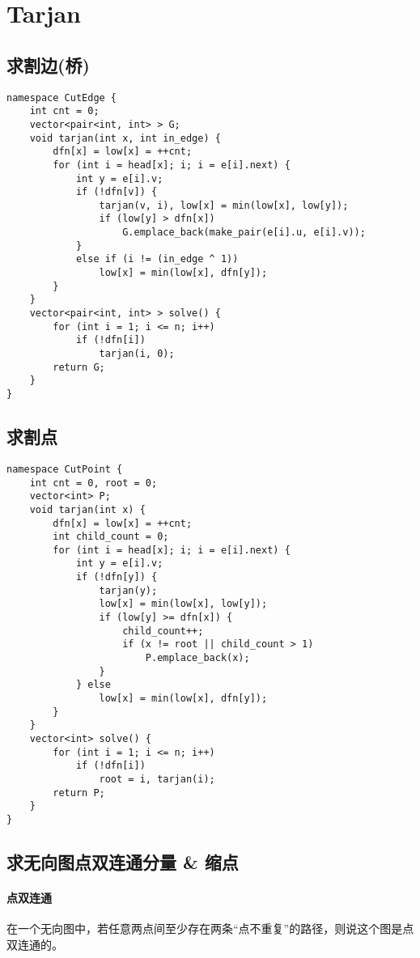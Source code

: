 \section{Tarjan}

\subsection{求割边(桥)}
\begin{verbatim}
namespace CutEdge {
    int cnt = 0;
    vector<pair<int, int> > G;
    void tarjan(int x, int in_edge) {
        dfn[x] = low[x] = ++cnt;
        for (int i = head[x]; i; i = e[i].next) {
            int y = e[i].v;
            if (!dfn[v]) {
                tarjan(v, i), low[x] = min(low[x], low[y]);
                if (low[y] > dfn[x])
                    G.emplace_back(make_pair(e[i].u, e[i].v));
            }
            else if (i != (in_edge ^ 1))
                low[x] = min(low[x], dfn[y]);
        }
    }
    vector<pair<int, int> > solve() {
        for (int i = 1; i <= n; i++)
            if (!dfn[i])
                tarjan(i, 0);
        return G;
    }
}
\end{verbatim}

\subsection{求割点}
\begin{verbatim}
namespace CutPoint {
    int cnt = 0, root = 0;
    vector<int> P;
    void tarjan(int x) {
        dfn[x] = low[x] = ++cnt;
        int child_count = 0;
        for (int i = head[x]; i; i = e[i].next) {
            int y = e[i].v;
            if (!dfn[y]) {
                tarjan(y);
                low[x] = min(low[x], low[y]);
                if (low[y] >= dfn[x]) {
                    child_count++;
                    if (x != root || child_count > 1)
                        P.emplace_back(x);
                }
            } else
                low[x] = min(low[x], dfn[y]);
        }
    }
    vector<int> solve() {
        for (int i = 1; i <= n; i++)
            if (!dfn[i])
                root = i, tarjan(i);
        return P;
    }
}
\end{verbatim}

\subsection{求无向图点双连通分量 \& 缩点}
\paragraph{点双连通} 在一个无向图中，若任意两点间至少存在两条“点不重复”的路径，则说这个图是点双连通的。

